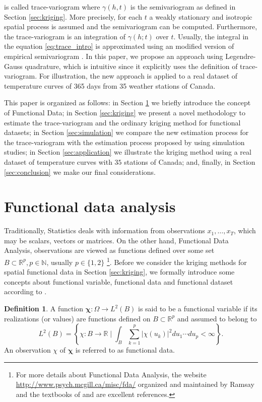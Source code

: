 \documentclass[12pt]{interact}
\theoremstyle{plain}%
\theoremstyle{definition}
\newtheorem{definition}[theorem]{Definition}
\theoremstyle{remark}
\begin{document}
is called trace-variogram where \(\gamma(h, t)\) is the semivariogram as defined in Section \ref{sec:kriging}.
More precisely, for each \(t\) a weakly stationary and isotropic spatial process is assumed and the semivariogram can be computed. Furthermore, the trace-variogram is an
integration of \(\gamma(h;t)\) over \(t\). Usually, the integral in the equation \eqref{eq:trace_intro} is approximated using an modified version of empirical semivariogram \citep[see][ for more details]{giraldo2011ordinary}.
In this paper, we propose an approach using Legendre-Gauss quadrature, which is intuitive since it explicitly uses the definition of trace-variogram.
For illustration, the new approach is applied to a real dataset of temperature curves of 365 days from 35 weather stations of Canada.

This paper is organized as follows: in Section \ref{sec:functionalDataAnalysis} we briefly introduce the concept of Functional Data; in Section \ref{sec:kriging} we present a novel methodology to estimate the trace-variogram and the ordinary kriging method for functional datasets; in Section \ref{sec:simulation} we compare the new estimation process for the trace-variogram with the estimation process proposed by \citet{giraldo2011ordinary} using simulation studies;
in Section \ref{sec:application} we illustrate the kriging method using a real dataset of temperature curves with \(35\) stations of Canada; and, finally, in Section \ref{sec:conclusion} we make our final considerations.

\section{Functional data analysis}\label{sec:functionalDataAnalysis}

Traditionally, Statistics deals with information from observations \(x_1, \dots, x_T\), which may be scalars, vectors or matrices. On the other hand, Functional Data Analysis,
observations are viewed as functions defined over some set \(B \subset \mathbb{R}^p, p \in \mathbb{N}\), usually \(p \in \{1,2\}\) \footnote{For more details about Functional Data Analysis, the website \url{http://www.psych.mcgill.ca/misc/fda/} organized and maintained by Ramsay and the textbooks of \citet{ramsay2006functional} and
	\citet{horvath2012inference} are excellent references.}. Before we consider the kriging methods for spatial functional data in Section \ref{sec:kriging}, we formally introduce some concepts about functional variable, functional data and functional dataset
according to \citet{ferraty2006nonparametric}.
\begin{definition}
	A function \(\bm{\chi}: \Omega \rightarrow L^2(B)\) is said to be a functional variable if its realizations (or values) are functions defined on \(B \subset \mathbb{R}^ p\) and assumed to belong to
	\[
	L^2(B) = \left\{\chi:B \longrightarrow \mathbb{R} \mid \int_B \sum_{k=1}^{p} \lvert \chi(u_k) \rvert^2 du_1\cdots du_p < \infty \right\}.
	\]
	An observation \(\chi\) of \(\bm{\chi}\) is referred to as functional data.
\end{definition}
\end{document}
